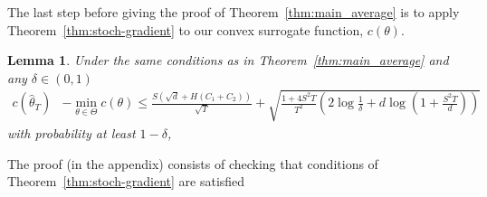 \documentclass[11pt]{article}
\newtheorem{lemma}[theorem]{Lemma}
\begin{document}
The last step before giving the proof of Theorem~\ref{thm:main_average} is to apply Theorem~\ref{thm:stoch-gradient} to our convex surrogate function, $c(\theta)$.
\begin{lemma}
\label{lem:risk-bound}
Under the same conditions as in Theorem~\ref{thm:main_average} and any $\delta\in (0,1)$
\begin{align}
\label{eq:err-bnd}
  c(\widehat \theta_T) &-  \min_{\theta\in\Theta} c(\theta)
                         \le
                         \frac{S(\sqrt{d} + H (C_1 + C_2))}{\sqrt{T}}
                         + \sqrt{\frac{1 + 4 S^2 T}{T^2} \left(2 \log\frac{1}{\delta}
                         + d \log \left( 1 + \frac{S^2 T}{d} \right) \right) } \;
\end{align}
with probability at least $1-\delta$,
\end{lemma}
The proof (in the appendix) consists of checking that conditions of Theorem~\ref{thm:stoch-gradient} are satisfied
\end{document}
